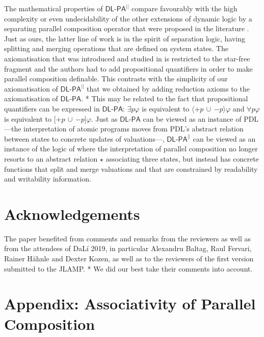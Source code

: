 \documentclass{llncs}
\newcommand{\pll}{ {||} }							%
\newcommand{\Dlpa}{\ensuremath{\mathsf{DL\text{-}PA}}\xspace}
\newcommand{\DlpaPll}{\ensuremath{\mathsf{DL\text{-}PA}^\pll}\xspace}
\newcommand{\ah}[1]{\**\marginpar{\textbf{AH:} #1}}
\newcommand{\assgntopV}[1]{{\mathtt {+} #1}}
\newcommand{\assgnbotV}[1]{{\mathtt {-} #1}}
\newcommand{\lbox}[1]{ \big[ #1 \big] }
\newcommand{\ldia}[1]{ \big\langle #1 \big\rangle}
\newcommand{\ndet}{\,{\cup}\,}
\renewcommand{\phi}{\varphi}
\begin{document}
The mathematical properties of \DlpaPll compare favourably with 
the high complexity or even undecidability of the 
other extensions of dynamic logic by a separating parallel composition operator that were proposed in the literature
\cite{BalbianiT14,Boudou16}.
Just as ours, the latter line of work is in the spirit of separation logic, having splitting and merging operations that are defined on system states. 
The axiomatisation that was introduced and studied in \cite{DBLP:journals/logcom/BalbianiB18} is restricted to the star-free fragment and the authors had to add propositional quantifiers in order to make parallel composition definable. 
This contrasts with the simplicity of our axiomatisation of \DlpaPll that we obtained by adding reduction axioms to the axiomatisation of \Dlpa. 
\ah{
phrase qui suit ajoutee
}
This may be related to the fact that propositional quantifiers can be expressed in \Dlpa: 
$\exists p \phi$ is equivalent to $\ldia{ \assgntopV p \ndet \assgnbotV p } \phi$ and 
$\forall p \phi$ is equivalent to $\lbox{ \assgntopV p \ndet \assgnbotV p } \phi$.
Just as \Dlpa can be viewed as an instance of PDL%
---the interpretation of atomic programs moves from PDL's abstract relation between states to concrete updates of valuations\mbox{---,}
\DlpaPll can be viewed as an instance of the logic of \cite{DBLP:journals/entcs/BenevidesFV11}
where the interpretation of parallel composition no longer resorts to
an abstract relation $\star$ associating three states, 
but instead has concrete functions that split and merge valuations and that are constrained by readability and writability information. 



\section{Acknowledgements}
The paper benefited from comments and remarks from the reviewers as well as from the attendees of DaL\'i 2019, 
in particular Alexandru Baltag, Raul Fervari, Rainer H\"ahnle and Dexter Kozen, as well as 
to the reviewers of the first version submitted to the JLAMP.
\ah{
ajoute
}
We did our best take their comments into account. 


\appendix
\section{Appendix: Associativity of Parallel Composition}


%


\end{document}
